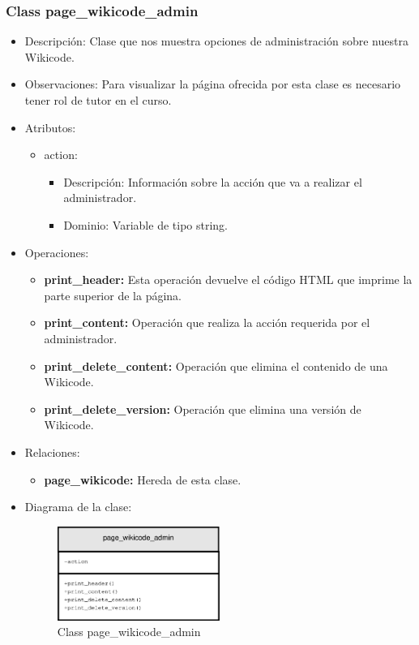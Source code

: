 \subsubsection{Class page\_wikicode\_admin}

\begin{itemize}
	\item Descripción: Clase que nos muestra opciones de administración sobre nuestra Wikicode.
	\item Observaciones: Para visualizar la página ofrecida por esta clase es necesario tener rol de tutor en el curso.
	\item Atributos:
		\begin{itemize}
			\item action:
				\begin{itemize}
					\item Descripción: Información sobre la acción que va a realizar el administrador.
					\item Dominio: Variable de tipo string.
				\end{itemize}
		\end{itemize}
	\item Operaciones:
		\begin{itemize}
			\item \textbf{print\_header: }Esta operación devuelve el código HTML que imprime la parte superior de la página.
			\item \textbf{print\_content: }Operación que realiza la acción requerida por el administrador.
			\item \textbf{print\_delete\_content: }Operación que elimina el contenido de una Wikicode.
			\item \textbf{print\_delete\_version: }Operación que elimina una versión de Wikicode.
		\end{itemize}
	\item Relaciones:
		\begin{itemize}
			\item \textbf{page\_wikicode:} Hereda de esta clase.
		\end{itemize}
	\item Diagrama de la clase:
		\begin{figure}[h]
			\centering
			\includegraphics[width=0.5\textwidth]{./img/page_wikicode_admin.eps}
			\caption{Class page\_wikicode\_admin}
		\end{figure}
\end{itemize}

